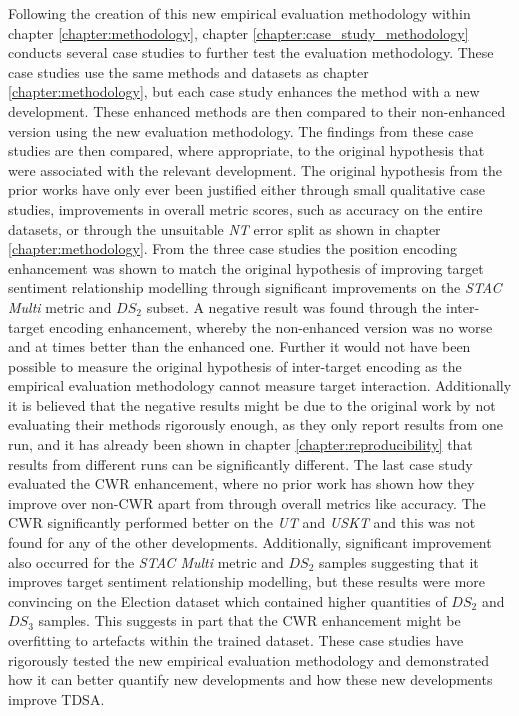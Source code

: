 Following the creation of this new empirical evaluation methodology within chapter \ref{chapter:methodology}, chapter \ref{chapter:case_study_methodology} conducts several case studies to further test the evaluation methodology. These case studies use the same methods and datasets as chapter \ref{chapter:methodology}, but each case study enhances the method with a new development. These enhanced methods are then compared to their non-enhanced version using the new evaluation methodology. The findings from these case studies are then compared, where appropriate, to the original hypothesis that were associated with the relevant development. The original hypothesis from the prior works have only ever been justified either through small qualitative case studies, improvements in overall metric scores, such as accuracy on the entire datasets, or through the unsuitable \textit{NT} error split as shown in chapter \ref{chapter:methodology}. From the three case studies the position encoding enhancement was shown to match the original hypothesis of improving target sentiment relationship modelling through significant improvements on the \textit{STAC Multi} metric and $DS_2$ subset. A negative result was found through the inter-target encoding enhancement, whereby the non-enhanced version was no worse and at times better than the enhanced one. Further it would not have been possible to measure the original hypothesis of inter-target encoding as the empirical evaluation methodology cannot measure target interaction. Additionally it is believed that the negative results might be due to the original work by \citet{hazarika-etal-2018-modeling} not evaluating their methods rigorously enough, as they only report results from one run, and it has already been shown in chapter \ref{chapter:reproducibility} that results from different runs can be significantly different. The last case study evaluated the CWR enhancement, where no prior work has shown how they improve over non-CWR apart from through overall metrics like accuracy. The CWR significantly performed better on the \textit{UT} and \textit{USKT} and this was not found for any of the other developments. Additionally, significant improvement also occurred for the \textit{STAC Multi} metric and $DS_2$ samples suggesting that it improves target sentiment relationship modelling, but these results were more convincing on the Election dataset which contained higher quantities of $DS_2$ and $DS_3$ samples. This suggests in part that the CWR enhancement might be overfitting to artefacts within the trained dataset. These case studies have rigorously tested the new empirical evaluation methodology and demonstrated how it can better quantify new developments and how these new developments improve TDSA. 

